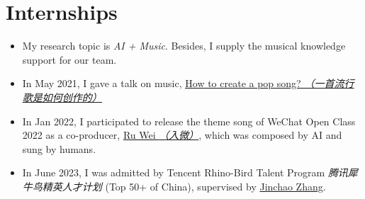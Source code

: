 \documentclass{resume}
\begin{document}
\section{Internships}
{\small {}
}
\begin{itemize}
  \item My research topic is \textit{AI + Music}. Besides, I supply the musical knowledge support for our
        team.
  \item In May 2021, I gave a talk on music,
        \href{https://www.zhangxueyao.com/data/wcpr-pop-music.pdf}{\underline{How to
            create a pop song? \textit{（一首流行歌是如何创作的）}}}
  \item In Jan 2022, I participated to release the theme song of WeChat Open Class 2022
        as a co-producer, \href{https://y.qq.com/n/ryqq/songDetail/000xeNJ53orPG2}{Ru
          Wei \textit{（入微）}}, which was composed by AI and sung by humans.
  \item In June 2023, I was admitted by Tencent Rhino-Bird Talent Program \textit{腾讯犀牛鸟精英人才计划}
        (Top 50+ of China), supervised by
        \href{https://scholar.google.com/citations?user=vH9YLsAAAAAJ&hl=en}{Jinchao
          Zhang}.
\end{itemize}
\end{document}
